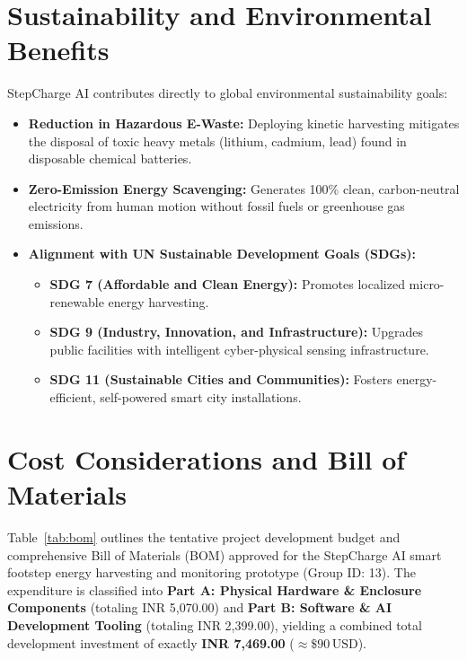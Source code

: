 \section{Sustainability and Environmental Benefits}
StepCharge AI contributes directly to global environmental sustainability goals:
\begin{itemize}[itemsep=2pt,parsep=1pt,topsep=3pt]
    \item \textbf{Reduction in Hazardous E-Waste:} Deploying kinetic harvesting mitigates the disposal of toxic heavy metals (lithium, cadmium, lead) found in disposable chemical batteries.
    \item \textbf{Zero-Emission Energy Scavenging:} Generates 100\% clean, carbon-neutral electricity from human motion without fossil fuels or greenhouse gas emissions.
    \item \textbf{Alignment with UN Sustainable Development Goals (SDGs):}
    \begin{itemize}[itemsep=1pt,parsep=0pt,topsep=2pt]
        \item \textbf{SDG 7 (Affordable and Clean Energy):} Promotes localized micro-renewable energy harvesting.
        \item \textbf{SDG 9 (Industry, Innovation, and Infrastructure):} Upgrades public facilities with intelligent cyber-physical sensing infrastructure.
        \item \textbf{SDG 11 (Sustainable Cities and Communities):} Fosters energy-efficient, self-powered smart city installations.
    \end{itemize}
\end{itemize}

\clearpage
\section{Cost Considerations and Bill of Materials}
Table~\ref{tab:bom} outlines the tentative project development budget and comprehensive Bill of Materials (BOM) approved for the StepCharge AI smart footstep energy harvesting and monitoring prototype (Group ID: 13). The expenditure is classified into \textbf{Part A: Physical Hardware \& Enclosure Components} (totaling INR 5,070.00) and \textbf{Part B: Software \& AI Development Tooling} (totaling INR 2,399.00), yielding a combined total development investment of exactly \textbf{INR 7,469.00} ($\approx \$90\,\text{USD}$).

